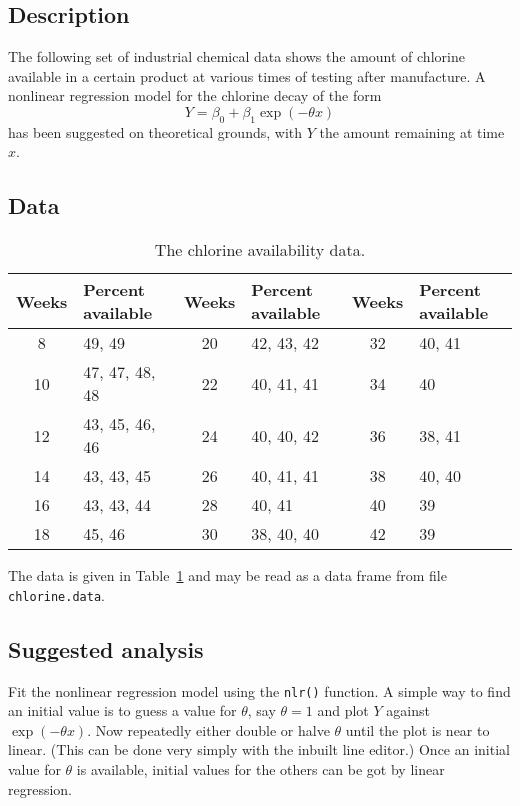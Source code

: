 \documentclass{article}
\newcommand{\strutt}{\vrule height 2.5ex depth 0.5ex width 0ex}%
\newcommand{\code}[1]{\texttt{#1}}
\begin{document}
\subsection*{Description}

The following set of industrial chemical data shows the amount of chlorine
available in a certain product at various times of testing after manufacture.
A nonlinear regression model for the chlorine decay of the form
\[
        Y = \beta_0 + \beta_1\exp(-\theta x)
\]
has been suggested on theoretical grounds, with $Y$ the amount remaining at
time $x$.

\subsection*{Data}

\begin{table}[ht]
\begin{center}
\begin{tabular}{@{\protect\strutt}|c|l||c|l||c|l|}
\hline
   Weeks  &  Percent available &   Weeks  &  Percent available &   Weeks  &
   Percent available \\
\hline
      8   &  49, 49&              20   &  42, 43, 42&      32   &  40, 41\\
     10   &  47, 47, 48, 48&      22   &  40, 41, 41&      34   &  40\\
     12   &  43, 45, 46, 46&      24   &  40, 40, 42&      36   &  38, 41\\
     14   &  43, 43, 45&          26   &  40, 41, 41&      38   &  40, 40\\
     16   &  43, 43, 44&          28   &  40, 41&          40   &  39\\
     18   &  45, 46&              30   &  38, 40, 40&      42   &  39\\
\hline
\end{tabular}
\end{center}

\caption{\label{chlorine} The chlorine availability data.}
\end{table}
The data is given in Table~\ref{chlorine} and may be read as a data frame from
file \code{chlorine.data}.

\subsection*{Suggested analysis}
Fit the nonlinear regression model using the \code{nlr()} function.  A
simple way to find an initial value is to guess a value for $\theta$, say
$\theta=1$ and plot $Y$ against $\exp(-\theta x)$.  Now repeatedly either
double or halve $\theta$ until the plot is near to linear.  (This can be
done very simply with the inbuilt line editor.)  Once an initial value for
$\theta$ is available, initial values for the others can be got by linear
regression.
\end{document}

